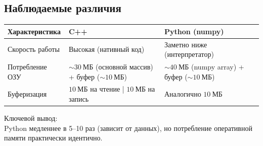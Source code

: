 \documentclass[oneside,a4paper,14pt]{extarticle} %
\begin{document}
	\subsection*{Наблюдаемые различия}
	\begin{table}[htbp]
		\centering
		\begin{tabular}{|p{4cm}|p{6cm}|p{6cm}|}
			\hline
			\textbf{Характеристика} & \textbf{C++} & \textbf{Python (numpy)} \\
			\hline
			Скорость работы & Высокая (нативный код) & Заметно ниже (интерпретатор) \\
			\hline
			Потребление ОЗУ & $\sim 30\ \text{МБ}$ (основной массив) + буфер ($\sim 10\ \text{МБ}$) & $\sim 40\ \text{МБ}$ (numpy array) + буфер ($\sim 10\ \text{МБ}$) \\
			\hline
			Буферизация & $10\ \text{МБ}$ на чтение | $10\ \text{МБ}$ на запись & Аналогично $10\ \text{МБ}$ \\
			\hline
		\end{tabular}
	\end{table}
	\noindent
	Ключевой вывод: \\
	\noindent
	Python медленнее в 5–10 раз (зависит от данных), но потребление оперативной памяти практически идентично.
\end{document}
